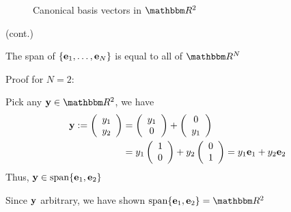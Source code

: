 \begin{frame}

    \begin{figure}
       \begin{center}
        
        \caption{\label{f:vec_canon} Canonical basis vectors in $\RR^2$}
       \end{center}
    \end{figure}

\end{frame}


\begin{frame}
    
    \vspace{2em}
    \Eg (cont.) 
    
    The span of $\{{\mathbf e}_1, \ldots, {\mathbf e}_N\}$ is equal
    to all of $\RR^N$
    
    Proof for $N=2$: 
    
    Pick any $\boldy \in \RR^2$, we have
    \begin{align*}
        {\mathbf y} 
        :=
        \left(
        \begin{array}{c}
            y_1 \\
            y_2
        \end{array}
        \right)
        & =
        \left(
        \begin{array}{c}
            y_1 \\
            0
        \end{array}
        \right)
        +
        \left(
        \begin{array}{c}
            0 \\
            y_1
        \end{array}
        \right)
        \\
        & =
        y_1
        \left(
        \begin{array}{c}
            1 \\
            0
        \end{array}
        \right)
        +
        y_2
        \left(
        \begin{array}{c}
            0 \\
            1
        \end{array}
        \right)
        = y_1 {\mathbf e}_1 + y_2 {\mathbf e}_2
    \end{align*}
    Thus, ${\mathbf y} \in \operatorname{span} \{{\mathbf e}_1, {\mathbf e}_2\}$ 
    
    Since ${\mathbf y}$ arbitrary, we have shown $\Span \{\bolde_1,
    \bolde_2\} = \RR^2$

\end{frame}

